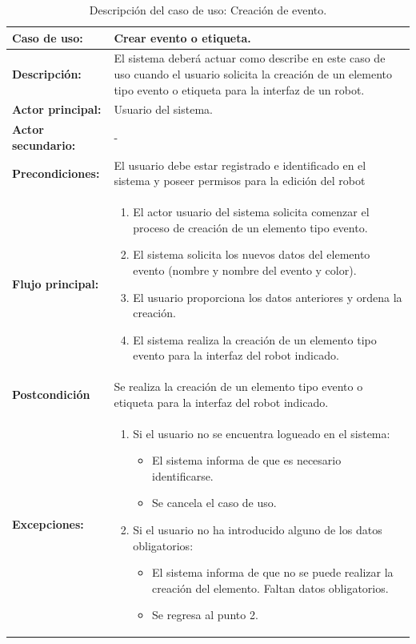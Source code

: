 \begin{table}[H]
  \begin{center}
    \begin{tabular}{|p{3.5cm}|p{10cm}|}
      \hline
      {\textbf{Caso de uso:}} & { Crear evento o etiqueta.} \\
      \hline
      {\textbf{Descripción:}} & { El sistema deberá actuar como describe en este caso de uso cuando el usuario solicita la creación de un elemento tipo evento o etiqueta para la interfaz de un robot.} \\
     \hline
      {\textbf{Actor principal:}} & { Usuario del sistema.} \\
      \hline
      {\textbf{Actor secundario:}} & { - } \\
      \hline
      {\textbf{Precondiciones:}} & { El usuario debe estar registrado e identificado en el sistema y poseer permisos para la edición del robot } \\
     \hline   
    {\textbf{Flujo principal:}} & { 
      \begin{enumerate}
	\item El actor usuario del sistema solicita comenzar el proceso de creación de un elemento tipo evento.
	\item El sistema solicita los nuevos datos del elemento evento (nombre y nombre del evento y color).
	\item El usuario proporciona los datos anteriores y ordena la creación.
	\item El sistema realiza la creación de un elemento tipo evento para la interfaz del robot indicado.
      \end{enumerate}
      } \\
     \hline
     {\textbf{Postcondición}} & {Se realiza la creación de un elemento tipo evento o etiqueta para la interfaz del robot indicado.}\\
     \hline
      {\textbf{Excepciones:}} & {
	\begin{enumerate}
	\item Si el usuario no se encuentra logueado en el sistema:
	\begin{itemize}
	  \item El sistema informa de que es necesario identificarse.
	  \item Se cancela el caso de uso.
	\end{itemize}
	\item Si el usuario no ha introducido alguno de los datos obligatorios:
	  \begin{itemize}
	    \item El sistema informa de que no se puede realizar la creación del elemento. Faltan datos obligatorios.
	    \item Se regresa al punto 2.
	  \end{itemize}
	\end{enumerate}
	}\\
      \hline
    \end{tabular}
  \end{center}
\caption{Descripción del caso de uso: Creación de evento.}
\end{table}


